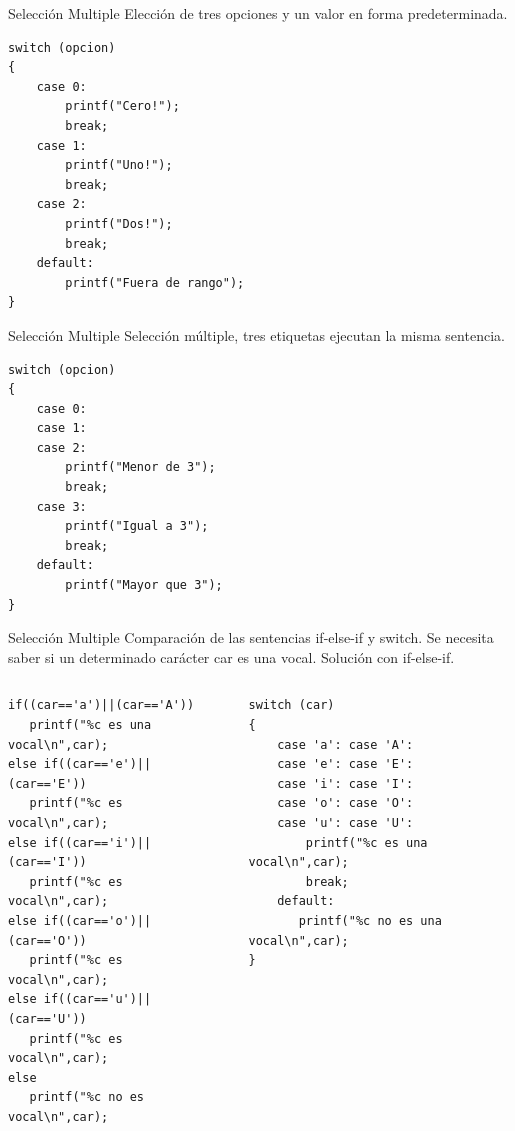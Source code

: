 \begin{frame}[c,fragile]{Selección Multiple}
\centering
Elección de tres opciones y un valor en forma predeterminada.
\begin{lstlisting}
switch (opcion)
{
    case 0:
        printf("Cero!");
        break;
    case 1:
        printf("Uno!");
        break;
    case 2:
        printf("Dos!");
        break;
    default:
        printf("Fuera de rango");
}
\end{lstlisting}
\end{frame}


\begin{frame}[c,fragile]{Selección Multiple}
\centering
Selección múltiple, tres etiquetas ejecutan la misma sentencia.
\begin{lstlisting}
switch (opcion)
{
    case 0:
    case 1:
    case 2:
        printf("Menor de 3");
        break;
    case 3:
        printf("Igual a 3");
        break;
    default:
        printf("Mayor que 3");
}
\end{lstlisting}
\end{frame}


\begin{frame}[fragile]{Selección Multiple}
Comparación de las sentencias if-else-if y switch. Se necesita saber si un determinado
carácter car es una vocal. Solución con if-else-if.
\vspace{2mm}
    \begin{columns}
        \begin{column}{0.4 \textwidth}
            \begin{lstlisting}[basicstyle=\ttfamily\tiny]
if((car=='a')||(car=='A'))
   printf("%c es una vocal\n",car);
else if((car=='e')||(car=='E'))
   printf("%c es vocal\n",car);
else if((car=='i')||(car=='I'))
   printf("%c es vocal\n",car);
else if((car=='o')||(car=='O'))
   printf("%c es vocal\n",car);
else if((car=='u')||(car=='U'))
   printf("%c es vocal\n",car);
else
   printf("%c no es vocal\n",car);
\end{lstlisting}
        \end{column}
        \begin{column}{0.5 \textwidth}
            \begin{lstlisting}[basicstyle=\ttfamily\tiny]
switch (car)
{
    case 'a': case 'A':
    case 'e': case 'E':
    case 'i': case 'I':
    case 'o': case 'O':
    case 'u': case 'U':
        printf("%c es una vocal\n",car);
        break;
    default:
       printf("%c no es una vocal\n",car);
}
\end{lstlisting}
        \end{column}
    \end{columns}

\end{frame}


